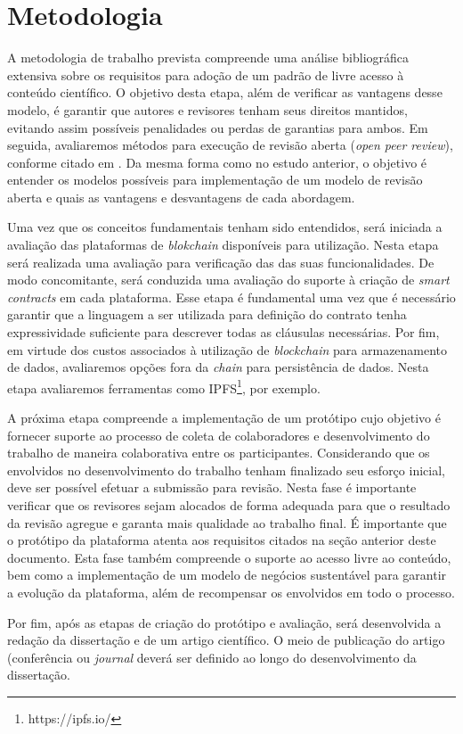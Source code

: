 \chapter{Metodologia}
A metodologia de trabalho prevista compreende uma análise bibliográfica extensiva sobre os requisitos para adoção de um padrão de livre acesso à conteúdo científico. O objetivo desta etapa, além de verificar as vantagens desse modelo, é garantir que autores e revisores tenham seus direitos mantidos, evitando assim possíveis penalidades ou perdas de garantias para ambos. Em seguida, avaliaremos métodos para execução de revisão aberta (\textit{open peer review}), conforme citado em \cite{InteractivePeerReview2010}. Da mesma forma como no estudo anterior, o objetivo é entender os modelos possíveis para implementação de um modelo de revisão aberta e quais as vantagens e desvantagens de cada abordagem.

Uma vez que os conceitos fundamentais tenham sido entendidos, será iniciada a avaliação das plataformas de \textit{blokchain} disponíveis para utilização. Nesta etapa será realizada uma avaliação para verificação das das suas funcionalidades. De modo concomitante, será conduzida uma avaliação do suporte à criação de \textit{smart contracts} em cada plataforma. Esse etapa é fundamental uma vez que é necessário garantir que a linguagem a ser utilizada para definição do contrato tenha expressividade suficiente para descrever todas as cláusulas necessárias. Por fim, em virtude dos custos associados à utilização de \textit{blockchain} para armazenamento de dados, avaliaremos opções fora da \textit{chain} para persistência de dados. Nesta etapa avaliaremos ferramentas como IPFS\footnote{https://ipfs.io/}, por exemplo.

A próxima etapa compreende a implementação de um protótipo cujo objetivo é fornecer suporte ao processo de coleta de colaboradores e desenvolvimento do trabalho de maneira colaborativa entre os participantes. Considerando que os envolvidos no desenvolvimento do trabalho tenham finalizado seu esforço inicial, deve ser possível efetuar a submissão para revisão. Nesta fase é importante verificar que os revisores sejam alocados de forma adequada para que o resultado da revisão agregue e garanta mais qualidade ao trabalho final. É importante que o protótipo da plataforma atenta aos requisitos citados na seção anterior deste documento. Esta fase também compreende o suporte ao acesso livre ao conteúdo, bem como a implementação de um modelo de negócios sustentável para garantir a evolução da plataforma, além de recompensar os envolvidos em todo o processo.

Por fim, após as etapas de criação do protótipo e avaliação, será desenvolvida a redação da dissertação e de um artigo científico. O meio de publicação do artigo (conferência ou \textit{journal} deverá ser definido ao longo do desenvolvimento da dissertação.